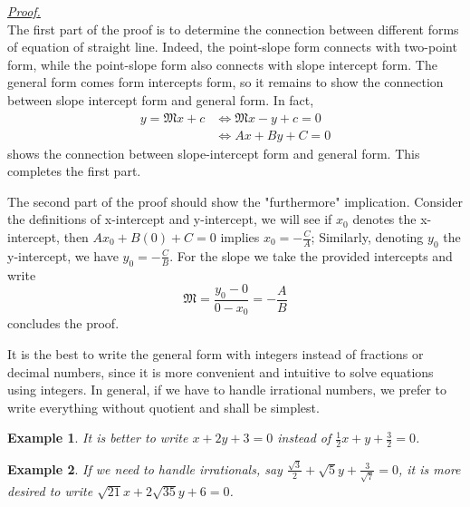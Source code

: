 \documentclass[12pt]{article}
\newtheorem*{example}{Example}
\renewenvironment{proof}[1][Proof]{\begin{snugshade*} \underline{\textit{{#1}.}}\\}{\hfill \qedsymbol \end{snugshade*}}
\begin{document}
    \begin{proof}
        The first part of the proof is to determine the connection between different forms of equation of straight line. Indeed, the point-slope form connects with two-point form, while the point-slope form also connects with slope intercept form. The general form comes form intercepts form, so it remains to show the connection between slope intercept form and general form. In fact, \begin{align*}
            y=\mathfrak{M}x+c &\iff \mathfrak{M}x-y+c=0\\
            &\iff Ax+By+C=0
        \end{align*}
        shows the connection between slope-intercept form and general form. This completes the first part.

        The second part of the proof should show the "furthermore" implication. Consider the definitions of x-intercept and y-intercept, we will see if $x_0$ denotes the x-intercept, then $Ax_0+B(0)+C=0$ implies $x_0=-\frac{C}{A}$; Similarly, denoting $y_0$ the y-intercept, we have $y_0=-\frac{C}{B}$. For the slope we take the provided intercepts and write $$\mathfrak{M}=\frac{y_0-0}{0-x_0}=-\frac{A}{B}$$ concludes the proof.
    \end{proof}

    It is the best to write the general form with integers instead of fractions or decimal numbers, since it is more convenient and intuitive to solve equations using integers. In general, if we have to handle irrational numbers, we prefer to write everything without quotient and shall be simplest.

    \begin{example}
        It is better to write $x+2y+3=0$ instead of $\frac{1}{2}x+y+\frac{3}{2}=0$.
    \end{example}

    \begin{example}
        If we need to handle irrationals, say $\frac{\sqrt{3}}{2}+\sqrt{5}y+\frac{3}{\sqrt{7}}=0$, it is more desired to write $\sqrt{21}x+2\sqrt{35}y+6=0$.
    \end{example}
\end{document}
